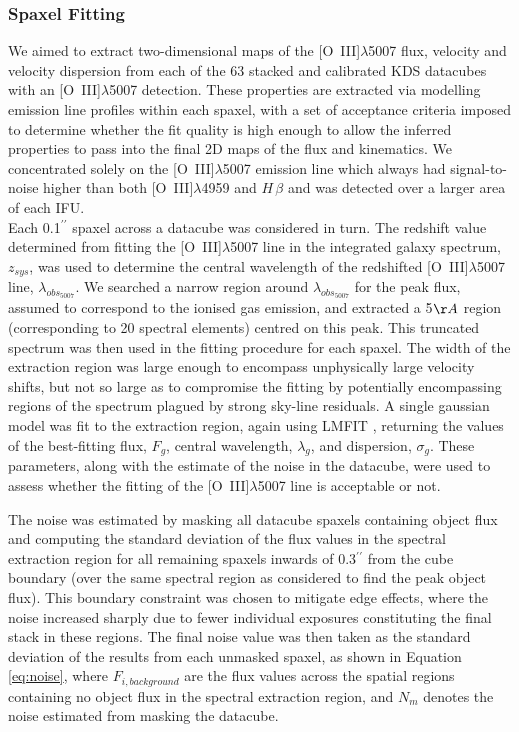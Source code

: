 \documentclass[fleqn,usenatbib]{mnras}
\begin{document}
\subsubsection{Spaxel Fitting}\label{subsubsection:spaxel_fitting}
We aimed to extract two-dimensional maps of the [O~{\sc III}]$\lambda$5007 flux, velocity and velocity dispersion from each of the 63 stacked and calibrated KDS datacubes with an [O~{\sc III}]$\lambda$5007 detection.
These properties are extracted via modelling emission line profiles within each spaxel, with a set of acceptance criteria imposed to determine whether the fit quality is high enough to allow the inferred properties to pass into the final 2D maps of the flux and kinematics.
We concentrated solely on the [O~{\sc III}]$\lambda$5007 emission line which always had signal-to-noise higher than both [O~{\sc III}]$\lambda$4959 and $H\,\beta$ and was detected over a larger area of each IFU. \\


Each 0.1$^{\prime\prime}$ spaxel across a datacube was considered in turn.
The redshift value determined from fitting the [O~{\sc III}]$\lambda$5007 line in the integrated galaxy spectrum, $z_{sys}$, was used to determine the central wavelength of the redshifted [O~{\sc III}]$\lambda$5007 line, $\lambda_{obs_{5007}}$. 
We searched a narrow region around $\lambda_{obs_{5007}}$ for the peak flux, assumed to correspond to the ionised gas emission, and extracted a 5$\AA$ region (corresponding to 20 spectral elements) centred on this peak.
This truncated spectrum was then used in the fitting procedure for each spaxel.
The width of the extraction region was large enough to encompass unphysically large velocity shifts, but not so large as to compromise the fitting by potentially encompassing regions of the spectrum plagued by strong sky-line residuals.
A single gaussian model was fit to the extraction region, again using {\scriptsize LMFIT} \citep{Newville2014}, returning the values of the best-fitting flux, $F_{g}$, central wavelength, $\lambda_{g}$, and dispersion, $\sigma_{g}$.
These parameters, along with the estimate of the noise in the datacube, were used to assess whether the fitting of the [O~{\sc III}]$\lambda$5007 line is acceptable or not. 

The noise was estimated by masking all datacube spaxels containing object flux and computing the standard deviation of the flux values in the spectral extraction region for all remaining spaxels inwards of 0.3$^{\prime\prime}$ from the cube boundary (over the same spectral region as considered to find the peak object flux).
This boundary constraint was chosen to mitigate edge effects, where the noise increased sharply due to fewer individual exposures constituting the final stack in these regions.
The final noise value was then taken as the standard deviation of the results from each unmasked spaxel, as shown in Equation \ref{eq:noise}, where $F_{i,background}$ are the flux values across the spatial regions containing no object flux in the spectral extraction region, and $N_{m}$ denotes the noise estimated from masking the datacube.
\end{document}
